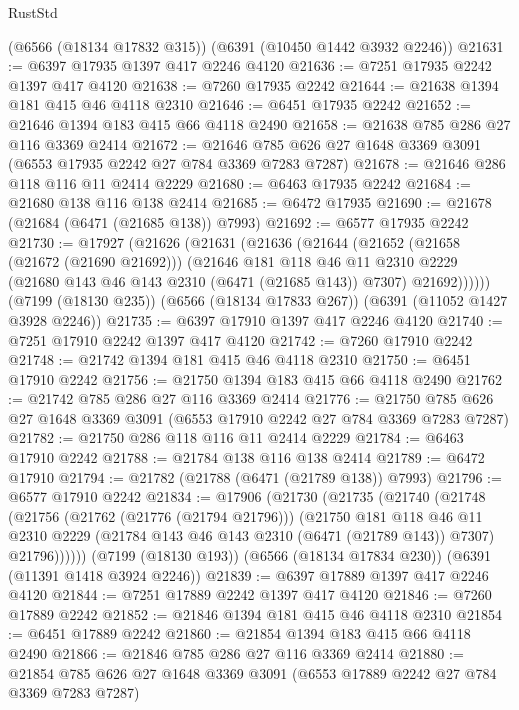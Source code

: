 \begin{lexlean}{RustStd}
\begin{coremodule}
{\begin{coremodule}
{{{{{{{{{{{{{{{{{{{{{{{{{{    (@6566 (@18134 @17832 @315))
    (@6391 (@10450 @1442 @3932 @2246))
@21631 := @6397 @17935 @1397 @417 @2246 @4120
@21636 := @7251 @17935 @2242 @1397 @417 @4120
@21638 := @7260 @17935 @2242
@21644 := @21638 @1394 @181 @415 @46 @4118 @2310
@21646 := @6451 @17935 @2242
@21652 := @21646 @1394 @183 @415 @66 @4118 @2490
@21658 := @21638 @785 @286 @27 @116 @3369 @2414
@21672 := @21646 @785 @626 @27 @1648 @3369 @3091 (@6553 @17935 @2242 @27 @784 @3369 @7283 @7287)
@21678 := @21646 @286 @118 @116 @11 @2414 @2229
@21680 := @6463 @17935 @2242
@21684 := @21680 @138 @116 @138 @2414
@21685 := @6472 @17935
@21690 := @21678 (@21684 (@6471 (@21685 @138)) @7993)
@21692 := @6577 @17935 @2242
@21730 := @17927
    (@21626
      (@21631
        (@21636
          (@21644
            (@21652
              (@21658 (@21672 (@21690 @21692)))
              (@21646
                @181
                @118
                @46
                @11
                @2310
                @2229
                (@21680 @143 @46 @143 @2310 (@6471 (@21685 @143)) @7307)
                @21692))))))
    (@7199 (@18130 @235))
    (@6566 (@18134 @17833 @267))
    (@6391 (@11052 @1427 @3928 @2246))
@21735 := @6397 @17910 @1397 @417 @2246 @4120
@21740 := @7251 @17910 @2242 @1397 @417 @4120
@21742 := @7260 @17910 @2242
@21748 := @21742 @1394 @181 @415 @46 @4118 @2310
@21750 := @6451 @17910 @2242
@21756 := @21750 @1394 @183 @415 @66 @4118 @2490
@21762 := @21742 @785 @286 @27 @116 @3369 @2414
@21776 := @21750 @785 @626 @27 @1648 @3369 @3091 (@6553 @17910 @2242 @27 @784 @3369 @7283 @7287)
@21782 := @21750 @286 @118 @116 @11 @2414 @2229
@21784 := @6463 @17910 @2242
@21788 := @21784 @138 @116 @138 @2414
@21789 := @6472 @17910
@21794 := @21782 (@21788 (@6471 (@21789 @138)) @7993)
@21796 := @6577 @17910 @2242
@21834 := @17906
    (@21730
      (@21735
        (@21740
          (@21748
            (@21756
              (@21762 (@21776 (@21794 @21796)))
              (@21750
                @181
                @118
                @46
                @11
                @2310
                @2229
                (@21784 @143 @46 @143 @2310 (@6471 (@21789 @143)) @7307)
                @21796))))))
    (@7199 (@18130 @193))
    (@6566 (@18134 @17834 @230))
    (@6391 (@11391 @1418 @3924 @2246))
@21839 := @6397 @17889 @1397 @417 @2246 @4120
@21844 := @7251 @17889 @2242 @1397 @417 @4120
@21846 := @7260 @17889 @2242
@21852 := @21846 @1394 @181 @415 @46 @4118 @2310
@21854 := @6451 @17889 @2242
@21860 := @21854 @1394 @183 @415 @66 @4118 @2490
@21866 := @21846 @785 @286 @27 @116 @3369 @2414
@21880 := @21854 @785 @626 @27 @1648 @3369 @3091 (@6553 @17889 @2242 @27 @784 @3369 @7283 @7287)
}}}}}}}}}}}}}}}}}}}}}}}}}}
\end{coremodule}}
\end{coremodule}
\end{lexlean}
